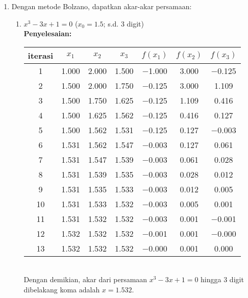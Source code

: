 \documentclass{article}
\newcommand{\penyelesaian}{\textbf{Penyelesaian: }}
\begin{document}
\begin{enumerate}
    \item Dengan metode Bolzano, dapatkan akar-akar persamaan:
    \begin{enumerate}
        \item $x^3 - 3x + 1 = 0$ ($x_0 = \num{1,5}$; s.d. 3 digit) \\
        \penyelesaian \\
        \begin{tabular}{|c|c|c|c|c|c|c|}
            \hline
            iterasi & $x_1$ & $x_2$ & $x_3$ & $f(x_1)$ & $f(x_2)$ & $f(x_3)$ \\
            \hline
            1 & \num{1,000} & \num{2,000} & \num{1,500} & \num{-1,000} & \num{3,000} & \num{-0,125}\\
            2 & \num{1,500} & \num{2,000} & \num{1,750} & \num{-0,125} & \num{3,000} & \num{1,109}\\
            3 & \num{1,500} & \num{1,750} & \num{1,625} & \num{-0,125} & \num{1,109} & \num{0,416}\\
            4 & \num{1,500} & \num{1,625} & \num{1,562} & \num{-0,125} & \num{0,416} & \num{0,127}\\
            5 & \num{1,500} & \num{1,562} & \num{1,531} & \num{-0,125} & \num{0,127} & \num{-0,003}\\
            6 & \num{1,531} & \num{1,562} & \num{1,547} & \num{-0,003} & \num{0,127} & \num{0,061}\\
            7 & \num{1,531} & \num{1,547} & \num{1,539} & \num{-0,003} & \num{0,061} & \num{0,028}\\
            8 & \num{1,531} & \num{1,539} & \num{1,535} & \num{-0,003} & \num{0,028} & \num{0,012}\\
            9 & \num{1,531} & \num{1,535} & \num{1,533} & \num{-0,003} & \num{0,012} & \num{0,005}\\
            10 & \num{1,531} & \num{1,533} & \num{1,532} & \num{-0,003} & \num{0,005} & \num{0,001}\\
            11 & \num{1,531} & \num{1,532} & \num{1,532} & \num{-0,003} & \num{0,001} & \num{-0,001}\\
            12 & \num{1,532} & \num{1,532} & \num{1,532} & \num{-0,001} & \num{0,001} & \num{-0,000}\\
            13 & \num{1,532} & \num{1,532} & \num{1,532} & \num{-0,000} & \num{0,001} & \num{0,000}\\
             \hline
            \end{tabular} \\
        Dengan demikian, akar dari persamaan $x^3 - 3x + 1 = 0$ hingga 3 digit dibelakang koma adalah $x = \num{1,532}$.
            

\end{enumerate}
\end{enumerate}
\end{document}
